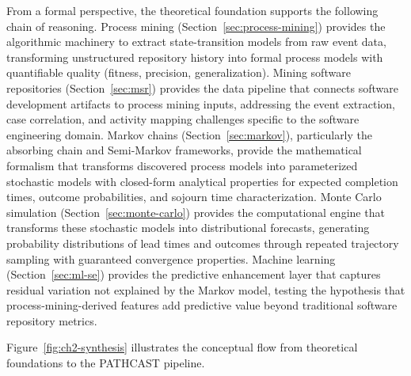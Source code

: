 From a formal perspective, the theoretical foundation supports the
following chain of reasoning. Process mining (Section~\ref{sec:process-mining})
provides the algorithmic machinery to extract state-transition models from
raw event data, transforming unstructured repository history into formal
process models with quantifiable quality (fitness, precision,
generalization). Mining software repositories
(Section~\ref{sec:msr}) provides the data pipeline that connects
software development artifacts to process mining inputs, addressing the
event extraction, case correlation, and activity mapping challenges
specific to the software engineering domain. Markov chains
(Section~\ref{sec:markov}), particularly the absorbing chain and
Semi-Markov frameworks, provide the mathematical formalism that
transforms discovered process models into parameterized stochastic
models with closed-form analytical properties for expected completion
times, outcome probabilities, and sojourn time characterization. Monte
Carlo simulation (Section~\ref{sec:monte-carlo}) provides the
computational engine that transforms these stochastic models into
distributional forecasts, generating probability distributions of lead
times and outcomes through repeated trajectory sampling with guaranteed
convergence properties. Machine learning
(Section~\ref{sec:ml-se}) provides the predictive enhancement layer
that captures residual variation not explained by the Markov model,
testing the hypothesis that process-mining-derived features add
predictive value beyond traditional software repository metrics.

Figure~\ref{fig:ch2-synthesis} illustrates the conceptual flow from
theoretical foundations to the PATHCAST pipeline.

